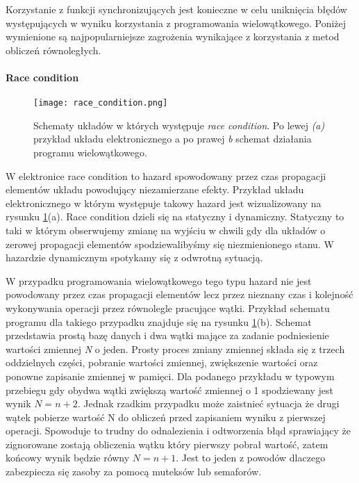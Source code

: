 Korzystanie z funkcji synchronizujących jest konieczne w celu uniknięcia błędów występujących w wyniku korzystania z programowania wielowątkowego. Poniżej wymienione są najpopularniejsze zagrożenia  wynikające z korzystania z metod obliczeń równoległych. 

\paragraph{Race condition}

\begin{figure}[t]
        \centering
        \texttt{[image: race\_condition.png]}
        \caption{Schematy układów w których występuje \textit{race condition}. Po lewej \textit{(a)} przykład układu elektronicznego a po prawej \textit{{b}} schemat działania programu wielowątkowego. }
        \label{race condition}
\end{figure}

W elektronice race condition to hazard spowodowany przez czas propagacji elementów układu powodujący niezamierzane efekty. Przykład układu elektronicznego w którym występuje takowy hazard jest wizualizowany na rysunku \ref{race condition}(a). 
Race condition dzieli się na statyczny i dynamiczny. Statyczny to taki w którym obserwujemy zmianę na wyjściu w chwili gdy dla układów o zerowej propagacji elementów spodziewalibyśmy się niezmienionego stanu.
W hazardzie dynamicznym spotykamy się z odwrotną sytuacją. 

W przypadku programowania wielowątkowego tego typu hazard nie jest powodowany przez czas propagacji elementów lecz przez nieznany czas i kolejność wykonywania operacji przez równolegle pracujące wątki. Przykład schematu programu dla takiego przypadku znajduje się na rysunku \ref{race condition}(b). Schemat przedstawia prostą bazę danych i dwa wątki mające za zadanie podniesienie wartości zmiennej \textit{N} o jeden.
Prosty proces zmiany zmiennej składa się z trzech oddzielnych części, pobranie wartości zmiennej, zwiększenie wartości oraz ponowne zapisanie zmiennej w pamięci. 
Dla podanego przykładu w typowym przebiegu gdy obydwa wątki zwiększą wartość zmiennej o 1 spodziewany jest wynik $N = n+2$. Jednak rzadkim przypadku może zaistnieć sytuacja że drugi wątek pobierze wartość N do obliczeń przed zapisaniem wyniku z pierwszej operacji. Spowoduje to trudny do odnalezienia i odtworzenia błąd sprawiający że zignorowane zostają obliczenia wątku który pierwszy pobrał wartość, zatem końcowy wynik będzie równy $N = n+1$.
Jest to jeden z powodów dlaczego zabezpiecza się zasoby za pomocą muteksów lub semaforów. 

